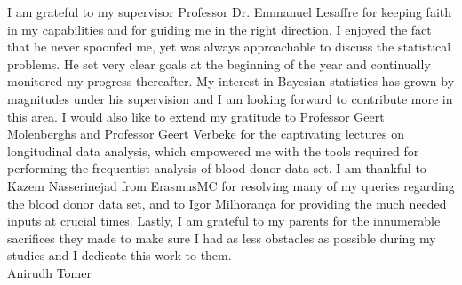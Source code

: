 I am grateful to my supervisor Professor Dr. Emmanuel Lesaffre for keeping faith in my capabilities and for guiding me in the right direction. I enjoyed the fact that he never spoonfed me, yet was always approachable to discuss the statistical problems. He set very clear goals at the beginning of the year and continually monitored my progress thereafter. My interest in Bayesian statistics has grown by magnitudes under his supervision and I am looking forward to contribute more in this area. I would also like to extend my gratitude to Professor Geert Molenberghs and Professor Geert Verbeke for the captivating lectures on longitudinal data analysis, which empowered me with the tools required for performing the frequentist analysis of blood donor data set. I am thankful to Kazem Nasserinejad from ErasmusMC for resolving many of my queries regarding the blood donor data set, and to Igor Milhorança for providing the much needed inputs at crucial times. Lastly, I am grateful to my parents for the innumerable sacrifices they made to make sure I had as less obstacles as possible during my studies and I dedicate this work to them.\\

Anirudh Tomer